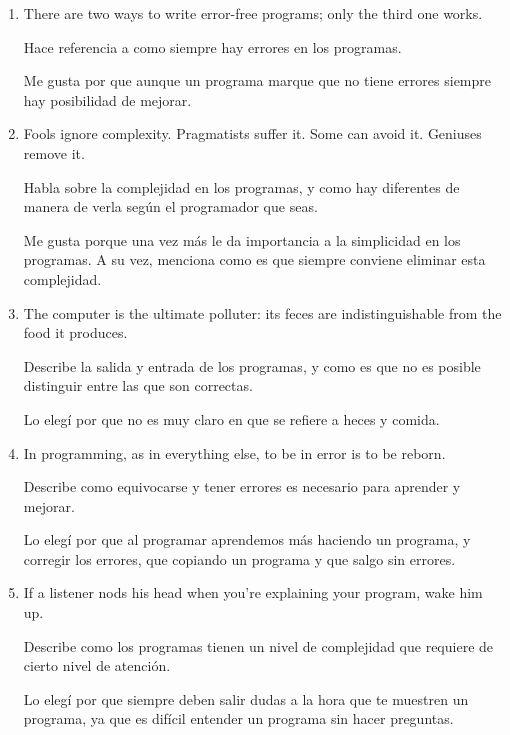 \documentclass{article}
\begin{document}
\begin{enumerate}
    \par Explica como es que los programas buenos generalmente son aquellos que requieran de cierta complejidad.
    \par Me gusta por que da una idea tangible sobre que vale la pena tomarse el tiempo para escribir. También, dice como es que puedes escribir un programa complejo pero si lo escribes sin estás dos cosas está mal planteado o ejecutado.
    \item There are two ways to write error-free programs; only the third one works.
    \par Hace referencia a como siempre hay errores en los programas.
    \par Me gusta por que aunque un programa marque que no tiene errores siempre hay posibilidad de mejorar.
    \item Fools ignore complexity. Pragmatists suffer it. Some can avoid it. Geniuses remove it.
    \par Habla sobre la complejidad en los programas, y como hay diferentes de manera de verla según el programador que seas.
    \par Me gusta porque una vez más le da importancia a la simplicidad en los programas. A su vez, menciona como es que siempre conviene eliminar esta complejidad.
    \item The computer is the ultimate polluter: its feces are indistinguishable from the food it produces. 
    \par Describe la salida y entrada de los programas, y como es que no es posible distinguir entre las que son correctas.
    \par Lo elegí por que no es muy claro en que se refiere a heces y comida.
    \item In programming, as in everything else, to be in error is to be reborn.
    \par Describe como equivocarse y tener errores es necesario para aprender y mejorar.
    \par Lo elegí por que al programar aprendemos más haciendo un programa, y corregir los errores, que copiando un programa y que salgo sin errores.
    \item If a listener nods his head when you’re explaining your program, wake him up. 
    \par Describe como los programas tienen un nivel de complejidad que requiere de cierto nivel de atención.
    \par Lo elegí por que siempre deben salir dudas a la hora que te muestren un programa, ya que es difícil entender un programa sin hacer preguntas.
\end{enumerate}
\end{document}
